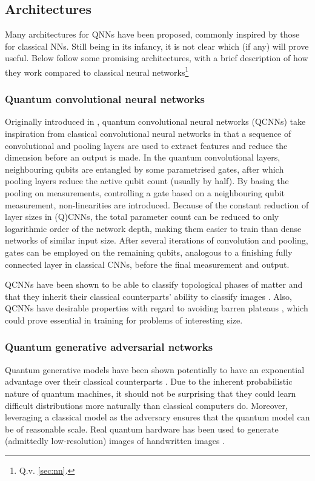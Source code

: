 \subsection{Architectures}
\label{sec:qnn_arch}
Many architectures for QNNs have been proposed, commonly inspired by those for classical NNs.
Still being in its infancy, it is not clear which (if any) will prove useful.
Below follow some promising architectures, with a brief description of how they work compared to classical neural networks\footnote{Q.v. \cref{sec:nn}.}

\subsubsection{Quantum convolutional neural networks}
\label{sec:qcnn}
Originally introduced in \cite{cong2019}, quantum convolutional neural networks (QCNNs) take inspiration from classical convolutional neural networks in that a sequence of convolutional and pooling layers are used to extract features and reduce the dimension before an output is made.
In the quantum convolutional layers, neighbouring qubits are entangled by some parametrised gates, after which pooling layers reduce the active qubit count (usually by half).
By basing the pooling on measurements, controlling a gate based on a neighbouring qubit measurement, non-linearities are introduced.
Because of the constant reduction of layer sizes in (Q)CNNs, the total parameter count can be reduced to only logarithmic order of the network depth, making them easier to train than dense networks of similar input size.
After several iterations of convolution and pooling, gates can be employed on the remaining qubits, analogous to a finishing fully connected layer in classical CNNs, before the final
measurement and output.

QCNNs have been shown to be able to classify topological phases of matter \cite{cong2019} and that they inherit their classical counterparts' ability to classify images \cite{oh2020}.
Also, QCNNs have desirable properties with regard to avoiding barren plateaus \cite{pesah2021}, which could prove essential in training for problems of interesting size.

\subsubsection{Quantum generative adversarial networks}
Quantum generative models have been shown potentially to have an exponential advantage over their classical counterparts \cite{gao2018}.
Due to the inherent probabilistic nature of quantum machines, it should not be surprising that they could learn difficult distributions more naturally than classical computers do.
Moreover, leveraging a classical model as the adversary ensures that the quantum model can be of reasonable scale.
Real quantum hardware has been used to generate (admittedly low-resolution) images of handwritten images \cite{huang2021}.

